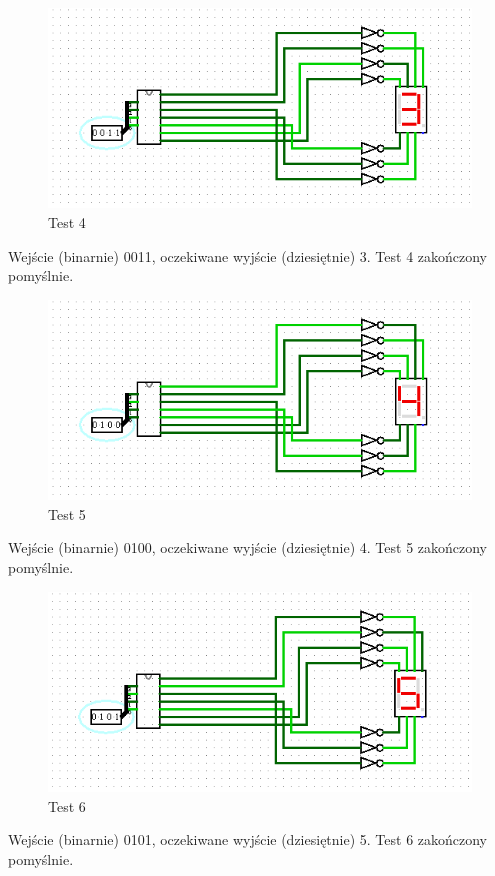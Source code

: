 \begin{figure}[H]
    \includegraphics[width=\linewidth]{ScreenshotsTests/Comp 1/Comp 1_00006.png}
    \caption{Test 4}
    \label{fig:test3}
\end{figure}
Wejście (binarnie) 0011, oczekiwane wyjście (dziesiętnie) 3.\newline
Test 4 zakończony pomyślnie.

\begin{figure}[H]
    \includegraphics[width=\linewidth]{ScreenshotsTests/Comp 1/Comp 1_00005.png}
    \caption{Test 5}
    \label{fig:test4}
\end{figure}
Wejście (binarnie) 0100, oczekiwane wyjście (dziesiętnie) 4.\newline
Test 5 zakończony pomyślnie.

\begin{figure}[H]
    \includegraphics[width=\linewidth]{ScreenshotsTests/Comp 1/Comp 1_00004.png}
    \caption{Test 6}
    \label{fig:test5}
\end{figure}
Wejście (binarnie) 0101, oczekiwane wyjście (dziesiętnie) 5.\newline
Test 6 zakończony pomyślnie.

